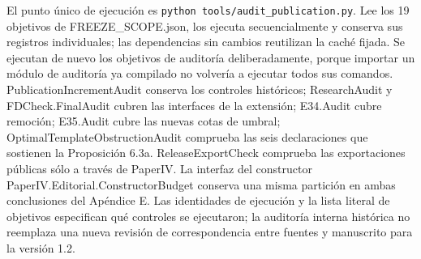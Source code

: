 \documentclass[spanish,11pt,a4paper]{article}
\begin{document}
El punto único de ejecución es \mbox{\texttt{python\ tools/audit\_publication.py}}. Lee los 19 objetivos de {\ttfamily\small FREEZE\_\discretionary{\hbox{\ensuremath{\hookrightarrow}}}{}{}SCOPE.\discretionary{\hbox{\ensuremath{\hookrightarrow}}}{}{}json}, los ejecuta secuencialmente y conserva sus registros individuales; las dependencias sin cambios reutilizan la caché fijada. Se ejecutan de nuevo los objetivos de auditoría deliberadamente, porque importar un módulo de auditoría ya compilado no volvería a ejecutar todos sus comandos. {\ttfamily\small PublicationI\discretionary{\hbox{\ensuremath{\hookrightarrow}}}{}{}ncrementAudi\discretionary{\hbox{\ensuremath{\hookrightarrow}}}{}{}t} conserva los controles históricos; {\ttfamily\small ResearchAudi\discretionary{\hbox{\ensuremath{\hookrightarrow}}}{}{}t} y {\ttfamily\small FDCheck.\discretionary{\hbox{\ensuremath{\hookrightarrow}}}{}{}FinalAudit} cubren las interfaces de la extensión; {\ttfamily\small E34.\discretionary{\hbox{\ensuremath{\hookrightarrow}}}{}{}Audit} cubre remoción; {\ttfamily\small E35.\discretionary{\hbox{\ensuremath{\hookrightarrow}}}{}{}Audit} cubre las nuevas cotas de umbral; {\ttfamily\small OptimalTempl\discretionary{\hbox{\ensuremath{\hookrightarrow}}}{}{}ateObstructi\discretionary{\hbox{\ensuremath{\hookrightarrow}}}{}{}onAudit} comprueba las seis declaraciones que sostienen la Proposición 6.3a. {\ttfamily\small ReleaseExpor\discretionary{\hbox{\ensuremath{\hookrightarrow}}}{}{}tCheck} comprueba las exportaciones públicas sólo a través de {\ttfamily\small PaperIV}. La interfaz del constructor {\ttfamily\small PaperIV.\discretionary{\hbox{\ensuremath{\hookrightarrow}}}{}{}Editorial.\discretionary{\hbox{\ensuremath{\hookrightarrow}}}{}{}ConstructorB\discretionary{\hbox{\ensuremath{\hookrightarrow}}}{}{}udget} conserva una misma partición en ambas conclusiones del Apéndice E. Las identidades de ejecución y la lista literal de objetivos especifican qué controles se ejecutaron; la auditoría interna histórica no reemplaza una nueva revisión de correspondencia entre fuentes y manuscrito para la versión 1.2.
\end{document}
